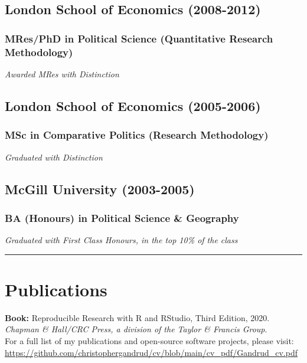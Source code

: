 \documentclass[a4paper]{article}
\begin{document}
\subsection*{London School of Economics (2008-2012)}
\subsubsection*{MRes/PhD in Political Science (Quantitative Research Methodology)}

\emph{Awarded MRes with Distinction}

\subsection*{London School of Economics (2005-2006)}
\subsubsection*{MSc in Comparative Politics (Research Methodology)}

\emph{Graduated with Distinction}

\subsection*{McGill University (2003-2005)}
\subsubsection*{BA (Honours) in Political Science \& Geography}

\emph{Graduated with First Class Honours, in the top 10\% of the class}

\vspace{0.25cm}
\medskip\hrule height 1pt
\vspace{0.5cm}


\section*{Publications}

\textbf{Book:} Reproducible Research with R and RStudio, Third Edition, 2020. {\emph{Chapman \& Hall/CRC Press, a division of the Taylor \& Francis Group}}. \\

\noindent For a full list of my publications and open-source software projects, please visit: \url{https://github.com/christophergandrud/cv/blob/main/cv_pdf/Gandrud_cv.pdf}
\end{document}
